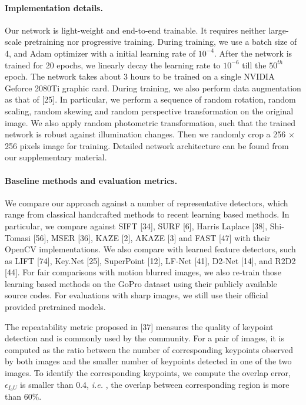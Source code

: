 \documentclass[10pt,twocolumn,letterpaper]{article}
\begin{document}
\paragraph{Implementation details.}
Our network is light-weight
and end-to-end trainable. It requires neither large-scale pretraining nor progressive training. During training, we use a batch size of 4, and Adam optimizer with a initial learning rate of $10^{-4}$. After the network is trained for 20 epochs, we linearly decay the learning rate to $10^{-6}$ till the $50^{th}$ epoch. The network takes about 3 hours to be trained on a single NVIDIA Geforce 2080Ti graphic card. During training, we also perform data augmentation as that of [25].
In particular, we perform a sequence of random rotation, random scaling, random skewing and random perspective transformation on the original image. We also apply random photometric transformation, such that the trained network is robust against illumination changes. Then we randomly crop a 256 × 256 pixels image for training. Detailed network architecture can be found from our supplementary material.

\paragraph{Baseline methods and evaluation metrics.}
We compare our approach against a number of representative detectors, which range from classical handcrafted methods to recent learning based methods. In particular, we compare against SIFT [34], SURF [6], Harris Laplace [38], Shi-Tomasi [56],
MSER [36], KAZE [2], AKAZE [3] and FAST [47] with
their OpenCV implementations. We also compare with
learned feature detectors, such as LIFT [74], Key.Net [25],
SuperPoint [12], LF-Net [41], D2-Net [14], and R2D2 [44].
For fair comparisons with motion blurred images, we also
re-train those learning based methods on the GoPro dataset
using their publicly available source codes. For evaluations
with sharp images, we still use their official provided pretrained models.

The repeatability metric proposed in [37] measures the
quality of keypoint detection and is commonly used by the
community. For a pair of images, it is computed as the ratio
between the number of corresponding keypoints observed
by both images and the smaller number of keypoints detected in one of the two images. To identify the corresponding keypoints, we compute the overlap error, $\epsilon_{I_{o}U}$ is smaller than 0.4, \textit{i.e.} , the overlap between corresponding region is more than $60\%$.
\end{document}
